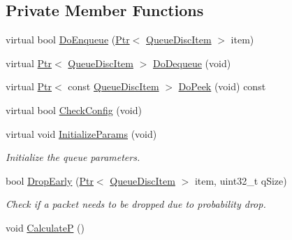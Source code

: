 \subsection*{Private Member Functions}
\begin{DoxyCompactItemize}
\item 
virtual bool \hyperlink{classns3_1_1PieQueueDisc_a583c0ac9ca43810a32af239e23e31614}{Do\+Enqueue} (\hyperlink{classns3_1_1Ptr}{Ptr}$<$ \hyperlink{classns3_1_1QueueDiscItem}{Queue\+Disc\+Item} $>$ item)
\item 
virtual \hyperlink{classns3_1_1Ptr}{Ptr}$<$ \hyperlink{classns3_1_1QueueDiscItem}{Queue\+Disc\+Item} $>$ \hyperlink{classns3_1_1PieQueueDisc_a7e3501e4e4a58b13d619f983a303e9cf}{Do\+Dequeue} (void)
\item 
virtual \hyperlink{classns3_1_1Ptr}{Ptr}$<$ const \hyperlink{classns3_1_1QueueDiscItem}{Queue\+Disc\+Item} $>$ \hyperlink{classns3_1_1PieQueueDisc_a7603fcf6f104697bef0f1a1d24826071}{Do\+Peek} (void) const 
\item 
virtual bool \hyperlink{classns3_1_1PieQueueDisc_af6eda43da222e1013754c8ed50ebeda4}{Check\+Config} (void)
\item 
virtual void \hyperlink{classns3_1_1PieQueueDisc_a181280e056b60150b024ab899b71f8f9}{Initialize\+Params} (void)
\begin{DoxyCompactList}\small\item\em Initialize the queue parameters. \end{DoxyCompactList}\item 
bool \hyperlink{classns3_1_1PieQueueDisc_a73c30e9ac6e37ba9dd2a362f0b45e6e3}{Drop\+Early} (\hyperlink{classns3_1_1Ptr}{Ptr}$<$ \hyperlink{classns3_1_1QueueDiscItem}{Queue\+Disc\+Item} $>$ item, uint32\+\_\+t q\+Size)
\begin{DoxyCompactList}\small\item\em Check if a packet needs to be dropped due to probability drop. \end{DoxyCompactList}\item 
void \hyperlink{classns3_1_1PieQueueDisc_a43714379ecc42291464ea1e861ac6633}{CalculateP} ()
\end{DoxyCompactItemize}
